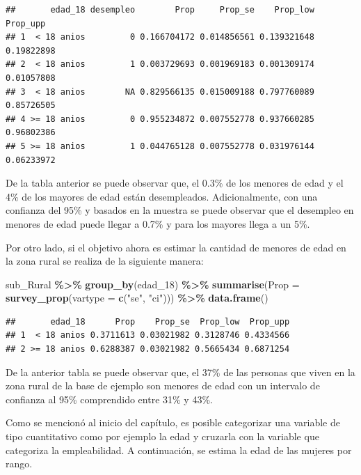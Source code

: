 \documentclass[
  12pt,
]{book}
\newenvironment{Shaded}{\begin{snugshade}}{\end{snugshade}}
\newcommand{\AttributeTok}[1]{\textcolor[rgb]{0.13,0.29,0.53}{#1}}
\newcommand{\FunctionTok}[1]{\textcolor[rgb]{0.13,0.29,0.53}{\textbf{#1}}}
\newcommand{\NormalTok}[1]{#1}
\newcommand{\SpecialCharTok}[1]{\textcolor[rgb]{0.81,0.36,0.00}{\textbf{#1}}}
\newcommand{\StringTok}[1]{\textcolor[rgb]{0.31,0.60,0.02}{#1}}
\begin{document}
\begin{verbatim}
##       edad_18 desempleo        Prop     Prop_se    Prop_low   Prop_upp
## 1  < 18 anios         0 0.166704172 0.014856561 0.139321648 0.19822898
## 2  < 18 anios         1 0.003729693 0.001969183 0.001309174 0.01057808
## 3  < 18 anios        NA 0.829566135 0.015009188 0.797760089 0.85726505
## 4 >= 18 anios         0 0.955234872 0.007552778 0.937660285 0.96802386
## 5 >= 18 anios         1 0.044765128 0.007552778 0.031976144 0.06233972
\end{verbatim}

De la tabla anterior se puede observar que, el 0.3\% de los menores de edad y el 4\% de los mayores de edad están desempleados. Adicionalmente, con una confianza del 95\% y basados en la muestra se puede observar que el desempleo en menores de edad puede llegar a 0.7\% y para los mayores llega a un 5\%.

Por otro lado, si el objetivo ahora es estimar la cantidad de menores de edad en la zona rural se realiza de la siguiente manera:

\begin{Shaded}
\begin{Highlighting}[]
\NormalTok{sub\_Rural }\SpecialCharTok{\%\textgreater{}\%} \FunctionTok{group\_by}\NormalTok{(edad\_18) }\SpecialCharTok{\%\textgreater{}\%} 
              \FunctionTok{summarise}\NormalTok{(}\AttributeTok{Prop =} \FunctionTok{survey\_prop}\NormalTok{(}\AttributeTok{vartype =}  \FunctionTok{c}\NormalTok{(}\StringTok{"se"}\NormalTok{, }\StringTok{"ci"}\NormalTok{))) }\SpecialCharTok{\%\textgreater{}\%}
              \FunctionTok{data.frame}\NormalTok{()}
\end{Highlighting}
\end{Shaded}

\begin{verbatim}
##       edad_18      Prop    Prop_se  Prop_low  Prop_upp
## 1  < 18 anios 0.3711613 0.03021982 0.3128746 0.4334566
## 2 >= 18 anios 0.6288387 0.03021982 0.5665434 0.6871254
\end{verbatim}

De la anterior tabla se puede observar que, el 37\% de las personas que viven en la zona rural de la base de ejemplo son menores de edad con un intervalo de confianza al 95\% comprendido entre 31\% y 43\%.

Como se mencionó al inicio del capítulo, es posible categorizar una variable de tipo cuantitativo como por ejemplo la edad y cruzarla con la variable que categoriza la empleabilidad. A continuación, se estima la edad de las mujeres por rango.
\end{document}
